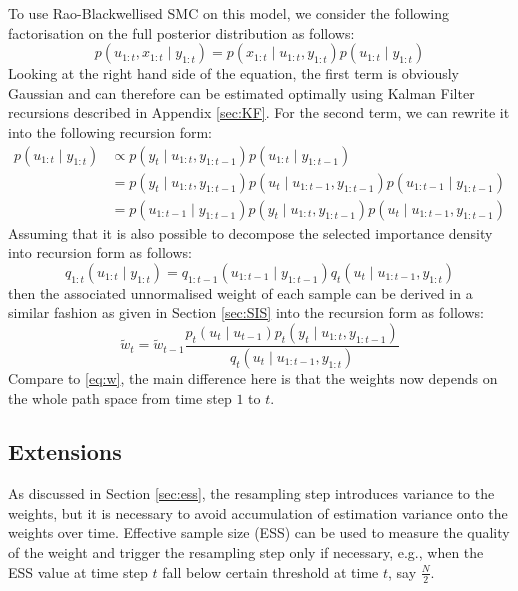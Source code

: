 To use Rao-Blackwellised SMC on this model, we consider the following factorisation on the full posterior distribution as follows:
\begin{equation}
  p(u_{1:t}, x_{1:t} \mid y_{1:t}) = p(x_{1:t} \mid u_{1:t}, y_{1:t}) p(u_{1:t} \mid y_{1:t})
\end{equation}
Looking at the right hand side of the equation, the first term is obviously Gaussian and can therefore can be estimated optimally using Kalman Filter recursions described in Appendix \ref{sec:KF}. For the second term, we can rewrite it into the following recursion form:
\begin{align}
p(u_{1:t} \mid y_{1:t}) &\propto p(y_t \mid u_{1:t}, y_{1:t-1}) p(u_{1:t} \mid y_{1:t-1}) \nonumber \\
&=  p(y_t \mid u_{1:t}, y_{1:t-1}) p(u_t \mid u_{1:t-1}, y_{1:t-1}) p(u_{1:t-1} \mid y_{1:t-1}) \nonumber \\
&=  p(u_{1:t-1} \mid y_{1:t-1}) p(y_t \mid u_{1:t}, y_{1:t-1}) p(u_t \mid u_{1:t-1}, y_{1:t-1})
\label{eq:msmc}
\end{align}
Assuming that it is also possible to decompose the selected importance density into recursion form as follows:
\begin{equation}
        q_{1:t}(u_{1:t} \mid y_{1:t}) = q_{1:t-1}(u_{1:t-1} \mid y_{1:t-1}) q_t(u_t \mid u_{1:t-1}, y_{1:t})
\label{eq:q2}
\end{equation}
then the associated unnormalised weight of each sample can be derived in a similar fashion as given in Section \ref{sec:SIS} into the recursion form as follows:
\begin{equation}
   \tilde{w}_t  = \tilde{w}_{t-1} \dfrac{p_t(u_t \mid u_{t-1})p_t(y_t \mid u_{1:t}, y_{1:t-1})}{q_t(u_t \mid u_{1:t-1}, y_{1:t})}
   \label{eq:wsmsc}
\end{equation}
Compare to \eqref{eq:w}, the main difference here is that the weights now depends on the whole path space from time step $1$ to $t$.

\subsection{Extensions}
As discussed in Section \ref{sec:ess}, the resampling step introduces variance to the weights, but it is necessary to avoid accumulation of estimation variance onto the weights over time. Effective sample size (ESS) can be used to measure the quality of the weight and trigger the resampling step only if necessary, e.g., 
when the ESS value at time step $t$ fall below certain threshold at time $t$, say $\frac{N}{2}$.

